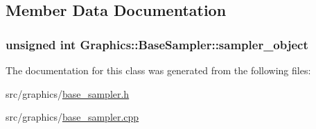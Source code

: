 \subsection{Member Data Documentation}
\hypertarget{class_graphics_1_1_base_sampler_a0c1d724ce8b7d59aafdd27cd57d2c45c}{}
\subsubsection[{sampler\+\_\+object}]{\setlength{\rightskip}{0pt plus 5cm}unsigned int Graphics\+::\+Base\+Sampler\+::sampler\+\_\+object\hspace{0.3cm}{\ttfamily [private]}}\label{class_graphics_1_1_base_sampler_a0c1d724ce8b7d59aafdd27cd57d2c45c}


The documentation for this class was generated from the following files\+:\begin{DoxyCompactItemize}
\item 
src/graphics/\hyperlink{base__sampler_8h}{base\+\_\+sampler.\+h}\item 
src/graphics/\hyperlink{base__sampler_8cpp}{base\+\_\+sampler.\+cpp}\end{DoxyCompactItemize}
